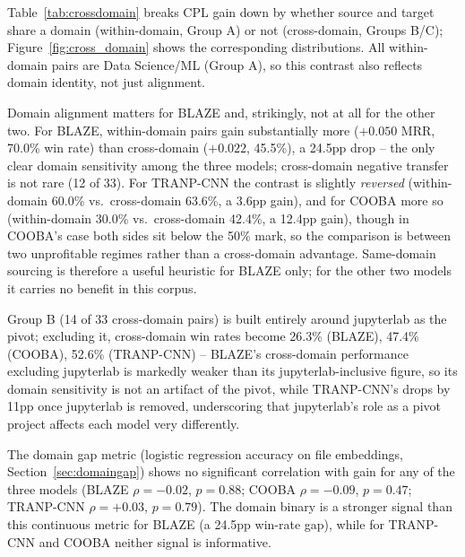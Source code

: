 \documentclass[a4paper,fleqn]{cas-dc}
\begin{document}
 Table~\ref{tab:crossdomain} breaks CPL gain down by whether source and
target share a domain (within-domain, Group A) or not (cross-domain, Groups
B/C); Figure~\ref{fig:cross_domain} shows the corresponding distributions.
All within-domain pairs are Data Science/ML (Group A), so this contrast also
reflects domain identity, not just alignment.

Domain alignment matters for BLAZE and, strikingly, not at all for the other
two. For BLAZE,
within-domain pairs gain substantially more ($+0.050$ MRR, 70.0\% win
rate) than cross-domain ($+0.022$, 45.5\%), a 24.5pp drop -- the only clear
domain sensitivity among the three models; cross-domain negative transfer is
not rare (12 of 33). For TRANP-CNN the contrast is slightly \emph{reversed}
(within-domain 60.0\% vs.\ cross-domain 63.6\%, a 3.6pp gain), and for COOBA
more so (within-domain 30.0\% vs.\ cross-domain 42.4\%, a 12.4pp gain),
though in COOBA's case both sides sit below the 50\% mark, so the comparison
is between two unprofitable regimes rather than a cross-domain advantage.
Same-domain sourcing is therefore a useful heuristic for BLAZE only; for the
other two models it carries no benefit in this corpus.

Group B (14 of 33 cross-domain pairs) is built entirely around jupyterlab
as the pivot; excluding it, cross-domain win rates become 26.3\% (BLAZE),
47.4\% (COOBA), 52.6\% (TRANP-CNN) -- BLAZE's cross-domain
performance excluding jupyterlab is markedly weaker than its
jupyterlab-inclusive figure, so its domain sensitivity is not an artifact of
the pivot, while TRANP-CNN's drops by 11pp once jupyterlab is removed,
underscoring that jupyterlab's role as a pivot project affects each model
very differently.

 The domain gap metric (logistic regression accuracy on file
embeddings, Section~\ref{sec:domaingap}) shows no significant correlation
with gain for any of the three models (BLAZE $\rho = -0.02$, $p = 0.88$;
COOBA $\rho = -0.09$, $p = 0.47$; TRANP-CNN $\rho = +0.03$, $p = 0.79$).
The domain binary is a stronger signal than this continuous metric for BLAZE
(a 24.5pp win-rate gap), while for TRANP-CNN and COOBA neither signal is informative.
\end{document}
